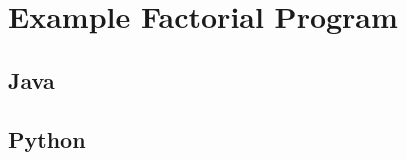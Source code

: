\documentclass{article}
\begin{document}
\newpage

\section{Example Factorial Program}
\subsection{Java}


\subsection{Python}

\end{document}
